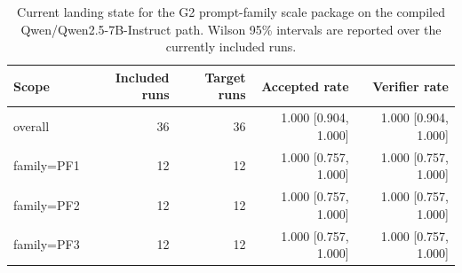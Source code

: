 \begin{table}[t]
\centering
\small
\begin{tabular}{lrrrr}
\toprule
Scope & Included runs & Target runs & Accepted rate & Verifier rate \\
\midrule
overall & 36 & 36 & 1.000 [0.904, 1.000] & 1.000 [0.904, 1.000] \\
family=PF1 & 12 & 12 & 1.000 [0.757, 1.000] & 1.000 [0.757, 1.000] \\
family=PF2 & 12 & 12 & 1.000 [0.757, 1.000] & 1.000 [0.757, 1.000] \\
family=PF3 & 12 & 12 & 1.000 [0.757, 1.000] & 1.000 [0.757, 1.000] \\
\bottomrule
\end{tabular}
\caption{Current landing state for the G2 prompt-family scale package on the compiled Qwen/Qwen2.5-7B-Instruct path. Wilson 95\% intervals are reported over the currently included runs.}
\end{table}
